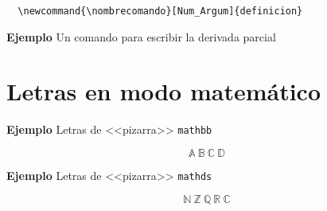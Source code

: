 \documentclass[11pt,a4paper]{report}
\begin{document}
%
\begin{verbatim}
  \newcommand{\nombrecomando}[Num_Argum]{definicion} 
\end{verbatim}
%





\bigskip
\textbf{Ejemplo} Un comando para escribir la derivada parcial



\bigskip





\section{Letras en modo matemático}





\bigskip
\textbf{Ejemplo} Letras de <<pizarra>> \texttt{mathbb}

\begin{equation*}
\mathbb{A \ B \ C \ D}
\end{equation*}

\bigskip





\bigskip
\textbf{Ejemplo} Letras de <<pizarra>> \texttt{mathds}

\begin{equation*}
\mathds{N \ Z \ Q \ R \ C}
\end{equation*}

\bigskip
\end{document}
